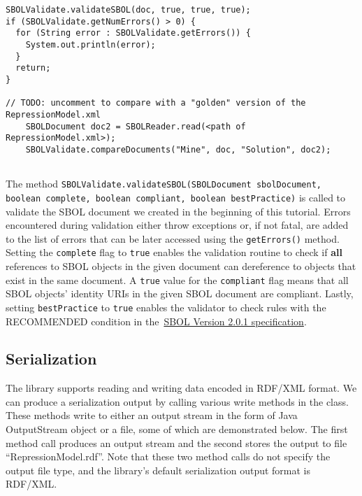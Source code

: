 \vspace{\abovedisplayskip}
\begin{minipage}{0.95\textwidth} 
\begin{lstlisting}
SBOLValidate.validateSBOL(doc, true, true, true);
if (SBOLValidate.getNumErrors() > 0) {
  for (String error : SBOLValidate.getErrors()) {
    System.out.println(error);
  }
  return;
}

// TODO: uncomment to compare with a "golden" version of the RepressionModel.xml
	SBOLDocument doc2 = SBOLReader.read(<path of RepressionModel.xml>);
	SBOLValidate.compareDocuments("Mine", doc, "Solution", doc2);
    
\end{lstlisting}
\end{minipage}

The method
\lstinline+SBOLValidate.validateSBOL(SBOLDocument sbolDocument, boolean complete, boolean compliant, boolean bestPractice)+ 
is called to validate the SBOL document we created in the beginning of
this tutorial. Errors encountered during validation either throw
exceptions or, if not fatal, are added to the list of errors that can
be later accessed using the \lstinline+getErrors()+ method. Setting the \lstinline+complete+
flag to \lstinline+true+ enables the validation routine to check if
{\bf all} references to SBOL objects in the given document can
dereference to objects that exist in the same document. A
\lstinline+true+ value for the \lstinline+compliant+ flag means that
all SBOL objects' identity URIs in the given SBOL document are
compliant. Lastly, setting \lstinline+bestPractice+ to
\lstinline+true+ enables the validator to check rules with the
RECOMMENDED condition in the~\href{http://sbolstandard.org/downloads/specification-data-model-2-0/}{SBOL
  Version 2.0.1 specification}.

\subsection*{Serialization}
The library supports reading and writing data encoded in RDF/XML
format. We can produce a serialization output by
calling various write methods in the 
class. These methods write to either an output stream in the form of
Java OutputStream object or a file, some
of which are demonstrated below. The first method call produces an output
stream and the second stores the output to file
``RepressionModel.rdf''. Note that these two method calls do not
specify the output file type, and the library's default serialization
output format is RDF/XML.

